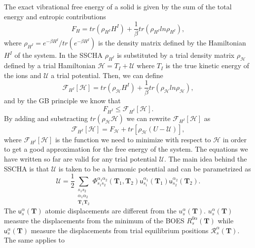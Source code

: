 The exact vibrational free energy of a solid is given by the sum of the total energy and entropic contributions
\begin{equation}
 F_{H}=tr(\rho_{H^{I}}H^{I})+\frac{1}{\beta}tr(\rho_{H^{I}}ln\rho_{H^{I}}),
\end{equation}
where $\rho_{H^{I}}=e^{-\beta H^{I}}/tr(e^{-\beta H^{I}})$ is the density matrix defined by the Hamiltonian $H^{I}$ of the system. In the SSCHA $\rho_{H^{I}}$ is substituted by a trial density matrix $\rho_{\mathcal{H}}$ defined 
by a trial Hamiltonian $\mathcal{H}=T_{I}+\mathcal{U}$ where $T_{I}$ is the true kinetic energy of the ions and $\mathcal{U}$ a trial potential. Then, we can define
\begin{equation}
 \mathcal{F}_{H^{I}}[\mathcal{H}]=tr(\rho_{\mathcal{H}}H^{I})+\frac{1}{\beta}tr(\rho_{\mathcal{H}}ln\rho_{\mathcal{H}}),
\end{equation}
and by the GB principle we know that
\begin{equation}
 F_{H^{I}}\le\mathcal{F}_{H^{I}}[\mathcal{H}].
\end{equation} 
By adding and substracting $tr(\rho_{\mathcal{H}}\mathcal{H})$ we can rewrite $\mathcal{F}_{H^{I}}[\mathcal{H}]$ as
\begin{equation}
 \label{scha-equation}
 \mathcal{F}_{H^{I}}[\mathcal{H}]=F_{\mathcal{H}}+tr[\rho_{\mathcal{H}}(U-\mathcal{U})],
\end{equation}
where $\mathcal{F}_{H^{I}}[\mathcal{H}]$ is the function we need to minimize with respect to $\mathcal{H}$ in order to get a good approximation for the free energy of the system. The equations we have written so far are valid 
for any trial potential $\mathcal{U}$. The main idea behind the SSCHA is that $\mathcal{U}$ is taken to be a harmonic potential and can be parametrized as
\begin{equation}
 \mathcal{U}=\frac{1}{2}\sum\limits_{\substack{s_{1}s_{2} \\ \alpha_{1}\alpha_{2} \\ \mathbf{T}_{1}\mathbf{T}_{2}}}\Phi_{s_{1}s_{2}}^{\alpha_{1}\alpha_{2}}(\mathbf{T}_{1},\mathbf{T}_{2})\mathsf{u}_{s_{1}}^{
 \alpha_{1}}(\mathbf{T}_{1})\mathsf{u}_{s_{2}}^{\alpha_{2}}(\mathbf{T}_{2}).
\end{equation}
The $\mathsf{u}_{s}^{\alpha}(\mathbf{T})$ atomic displacements are different from the $u_{s}^{\alpha}(\mathbf{T})$. $u_{s}^{\alpha}(\mathbf{T})$ measure the displacements from the minimum of the BOES $R_{s}^{0\alpha}(\mathbf{T})$
while $\mathsf{u}_{s}^{\alpha}(\mathbf{T})$ measure the displacements from trial equilibrium positions $\mathcal{R}_{s}^{\alpha}(\mathbf{T})$. The same applies to 
